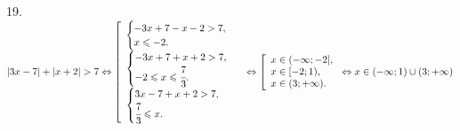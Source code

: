 19. $|3x-7|+|x+2|>7\Leftrightarrow \left[\begin{array}{l}\begin{cases} -3x+7-x-2>7,\\ x\leqslant -2.\end{cases}\\
\begin{cases} -3x+7+x+2>7,\\ -2\leqslant x\leqslant \cfrac{7}{3}.\end{cases}\\\begin{cases} 3x-7+x+2>7,\\ \cfrac{7}{3}\leqslant x.\end{cases}\end{array}\right.\Leftrightarrow
\left[\begin{array}{l}
x\in(-\infty;-2],\\
x\in[-2;1),\\
x\in(3;+\infty).\end{array}\right.\Leftrightarrow x\in(-\infty;1)\cup(3;+\infty)$\newpage\noindent
